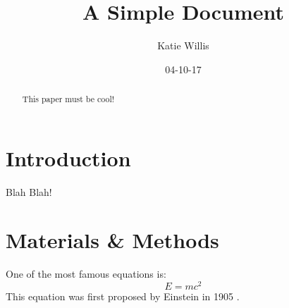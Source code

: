 \documentclass[12pt]{article}
\title{A Simple Document}
\author{Katie Willis}
\date{04-10-17}
\begin{document}
  \maketitle

  \begin{abstract}
    This paper must be cool!
  \end{abstract}

  \section{Introduction}
    Blah Blah!

  \section{Materials \& Methods}
    One of the most famous equations is:
  \begin{equation}
    E = mc^2
  \end{equation}
  This equation was first proposed by Einstein in 1905
  \cite{einstein1905does}.

  
  
\end{document}
